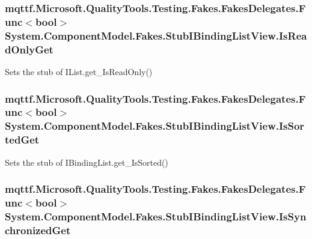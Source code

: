 \hypertarget{class_system_1_1_component_model_1_1_fakes_1_1_stub_i_binding_list_view_a56a9a25b76a00c5105f7e5959e0b59bd}{
\subsubsection[{Is\-Read\-Only\-Get}]{\setlength{\rightskip}{0pt plus 5cm}mqttf.\-Microsoft.\-Quality\-Tools.\-Testing.\-Fakes.\-Fakes\-Delegates.\-Func$<$bool$>$ System.\-Component\-Model.\-Fakes.\-Stub\-I\-Binding\-List\-View.\-Is\-Read\-Only\-Get}}\label{class_system_1_1_component_model_1_1_fakes_1_1_stub_i_binding_list_view_a56a9a25b76a00c5105f7e5959e0b59bd}


Sets the stub of I\-List.\-get\-\_\-\-Is\-Read\-Only()

\hypertarget{class_system_1_1_component_model_1_1_fakes_1_1_stub_i_binding_list_view_aa0d1dabea3177f3a9b5ee2079250d03b}{
\subsubsection[{Is\-Sorted\-Get}]{\setlength{\rightskip}{0pt plus 5cm}mqttf.\-Microsoft.\-Quality\-Tools.\-Testing.\-Fakes.\-Fakes\-Delegates.\-Func$<$bool$>$ System.\-Component\-Model.\-Fakes.\-Stub\-I\-Binding\-List\-View.\-Is\-Sorted\-Get}}\label{class_system_1_1_component_model_1_1_fakes_1_1_stub_i_binding_list_view_aa0d1dabea3177f3a9b5ee2079250d03b}


Sets the stub of I\-Binding\-List.\-get\-\_\-\-Is\-Sorted()

\hypertarget{class_system_1_1_component_model_1_1_fakes_1_1_stub_i_binding_list_view_a2a07f889ebc396d2106fb2eaf96bc309}{
\subsubsection[{Is\-Synchronized\-Get}]{\setlength{\rightskip}{0pt plus 5cm}mqttf.\-Microsoft.\-Quality\-Tools.\-Testing.\-Fakes.\-Fakes\-Delegates.\-Func$<$bool$>$ System.\-Component\-Model.\-Fakes.\-Stub\-I\-Binding\-List\-View.\-Is\-Synchronized\-Get}}\label{class_system_1_1_component_model_1_1_fakes_1_1_stub_i_binding_list_view_a2a07f889ebc396d2106fb2eaf96bc309}


